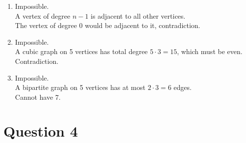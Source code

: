 \documentclass[twoside]{article}
\begin{document}
\begin{enumerate}
    \item[(a)]  Impossible.  \\
                A vertex of degree $n-1$ is adjacent to all other vertices.  \\
                The vertex of degree 0 would be adjacent to it, contradiction. 
    \item[(b)]  Impossible.  \\
                A cubic graph on 5 vertices has total degree \(5 \cdot 3 = 15\), which must be even.  \\
                Contradiction.
    \item[(c)]  Impossible.  \\
                A bipartite graph on 5 vertices has at most \(2\cdot 3 = 6\) edges. \\  
                Cannot have 7.
\end{enumerate}

\section*{Question 4}
\end{document}
